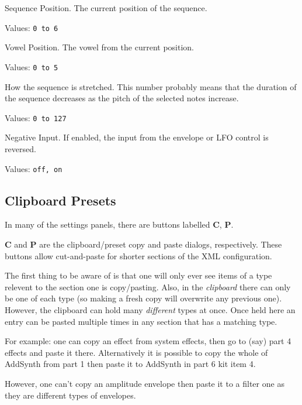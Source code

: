    Sequence Position.
   The current position of the sequence.

   Values:  \texttt{0 to 6}

   Vowel Position.
   The vowel from the current position.

   Values:  \texttt{0 to 5}

   How the sequence is stretched.
   This number probably means that the duration of the sequence decreases as
   the pitch of the selected notes increase.

   Values:  \texttt{0 to 127}

   Negative Input.
   If enabled, the input from the envelope or LFO control is reversed.

   Values:  \texttt{off, on}

\subsection{Clipboard Presets}
\label{subsec:clipboard_presets}

   In many of the settings panels, there are buttons
   labelled \textbf{C}, \textbf{P}.


   \textbf{C} and \textbf{P} are the clipboard/preset copy and paste
   dialogs, respectively.
   These buttons allow cut-and-paste for shorter sections of the XML
   configuration.

   The first thing to be aware of is that one will only ever see items of a type
   relevent to the section one is copy/pasting. Also, in the \textsl{clipboard}
   there can only be one of each type (so making a fresh copy will overwrite any
   previous one). However, the clipboard can hold many \textsl{different} types at
   once. Once held here an entry can be pasted multiple times in any section that
   has a matching type.

   For example: one can copy an effect from system effects, then go to (say) part 4
   effects and paste it there. Alternatively it is possible to copy the whole of
   AddSynth from part 1 then paste it to AddSynth in part 6 kit item 4.

   However, one can't copy an amplitude envelope then paste it to a filter one as
   they are different types of envelopes.


